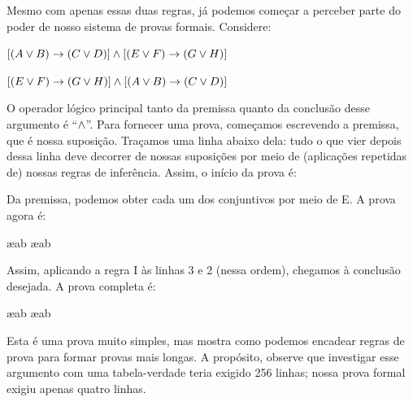 Mesmo com apenas essas duas regras, já podemos começar a perceber parte do poder de nosso sistema de provas formais. Considere:
\begin{earg}
\item[] $[(A\vee B)\rightarrow(C\vee D)] \wedge [(E \vee F) \rightarrow (G\vee H)]$
\item[\texttherefore] $[(E \vee F) \rightarrow (G\vee H)] \wedge [(A\vee B)\rightarrow(C\vee D)]$
\end{earg}
O operador lógico principal tanto da premissa quanto da conclusão desse argumento é \textquotedblleft$\wedge$\textquotedblright{}. Para fornecer uma prova, começamos escrevendo a premissa, que é nossa suposição. Traçamos uma linha abaixo dela: tudo o que vier depois dessa linha deve decorrer de nossas suposições por meio de (aplicações repetidas de) nossas regras de inferência. Assim, o início da prova é:
\begin{fitchproof}
	\PR
\end{fitchproof}
Da premissa, podemos obter cada um dos conjuntivos por meio de {\eand}E. A prova agora é:
\begin{fitchproof}
	\PR
	 \ae{ab}
	 \ae{ab}
\end{fitchproof}
Assim, aplicando a regra {\eand}I às linhas 3 e 2 (nessa ordem), chegamos à conclusão desejada. A prova completa é:
\begin{fitchproof}
	\PR

	 \ae{ab}
	 \ae{ab}
	 
\end{fitchproof}
Esta é uma prova muito simples, mas mostra como podemos encadear regras de prova para formar provas mais longas. A propósito, observe que investigar esse argumento com uma tabela-verdade teria exigido 256 linhas; nossa prova formal exigiu apenas quatro linhas.

